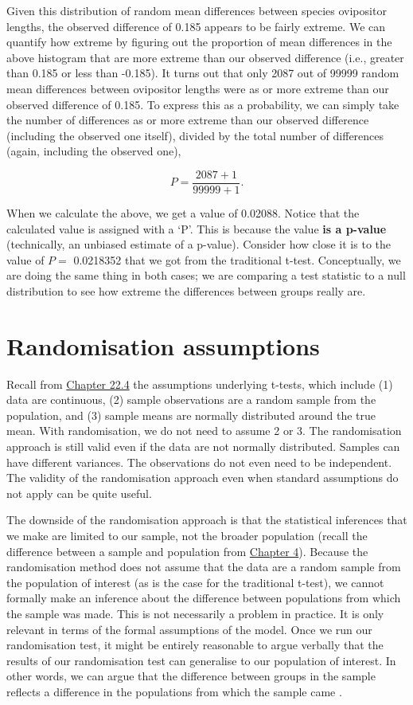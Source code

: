 \documentclass[
]{scrbook}
\begin{document}
Given this distribution of random mean differences between species ovipositor lengths, the observed difference of 0.185 appears to be fairly extreme.
We can quantify how extreme by figuring out the proportion of mean differences in the above histogram that are more extreme than our observed difference (i.e., greater than 0.185 or less than -0.185).
It turns out that only 2087 out of 99999 random mean differences between ovipositor lengths were as or more extreme than our observed difference of 0.185.
To express this as a probability, we can simply take the number of differences as or more extreme than our observed difference (including the observed one itself), divided by the total number of differences (again, including the observed one),

\[P = \frac{2087 + 1}{99999 + 1}.\]

When we calculate the above, we get a value of 0.02088.
Notice that the calculated value is assigned with a `P'.
This is because the value \textbf{is a p-value} (technically, an unbiased estimate of a p-value). Consider how close it is to the value of \(P =\) 0.0218352 that we got from the traditional t-test.
Conceptually, we are doing the same thing in both cases; we are comparing a test statistic to a null distribution to see how extreme the differences between groups really are.

\hypertarget{randomisation-assumptions}{%
\section{Randomisation assumptions}\label{randomisation-assumptions}}

Recall from \protect\hyperlink{assumptions-of-t-tests}{Chapter 22.4} the assumptions underlying t-tests, which include (1) data are continuous, (2) sample observations are a random sample from the population, and (3) sample means are normally distributed around the true mean.
With randomisation, we do not need to assume 2 or 3.
The randomisation approach is still valid even if the data are not normally distributed.
Samples can have different variances.
The observations do not even need to be independent.
The validity of the randomisation approach even when standard assumptions do not apply can be quite useful.

The downside of the randomisation approach is that the statistical inferences that we make are limited to our sample, not the broader population (recall the difference between a sample and population from \protect\hyperlink{Chapter_4}{Chapter 4}).
Because the randomisation method does not assume that the data are a random sample from the population of interest (as is the case for the traditional t-test), we cannot formally make an inference about the difference between populations from which the sample was made.
This is not necessarily a problem in practice.
It is only relevant in terms of the formal assumptions of the model.
Once we run our randomisation test, it might be entirely reasonable to argue verbally that the results of our randomisation test can generalise to our population of interest.
In other words, we can argue that the difference between groups in the sample reflects a difference in the populations from which the sample came \citep{Ludbrook1998, Ernst2004}.
\end{document}
